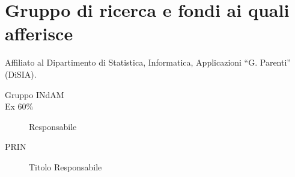 \documentclass[11pt]{article}
\begin{document}
\section*{Gruppo di ricerca e fondi ai quali afferisce}

Affiliato al Dipartimento di Statistica, Informatica, Applicazioni
``G. Parenti'' (DiSIA).

\begin{description}

\item[Gruppo INdAM] %

\item[Ex 60\%] Responsabile %

\item[PRIN] Titolo\hskip 2cm Responsabile %


\end{description}


\vfill
\end{document}

